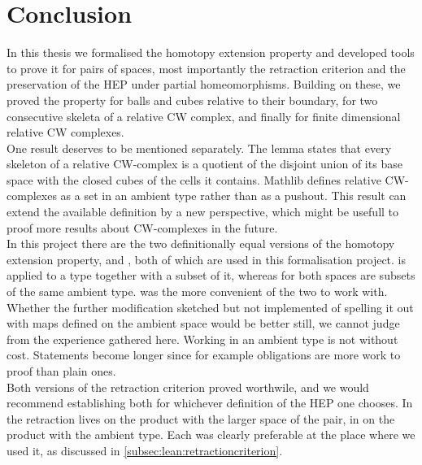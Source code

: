 \documentclass[11pt, a4paper, english]{article}
\theoremstyle{plain}
\theoremstyle{definition}
\theoremstyle{remark}
\numberwithin{equation}{section}
\numberwithin{theorem}{section}
\begin{document}
\clearpage
\section{Conclusion} \label{section:conclusion}
In this thesis we formalised the homotopy extension property and developed tools to prove it for pairs of spaces, most importantly the retraction criterion and the preservation of the HEP under partial homeomorphisms. Building on these, we proved the property for balls and cubes relative to their boundary, for two consecutive skeleta of a relative CW complex, and finally for finite dimensional relative CW complexes.\\

One result deserves to be mentioned separately. The lemma  states that every skeleton of a relative CW-complex is a quotient of the disjoint union of its base space with the closed cubes of the cells it contains. Mathlib defines relative CW-complexes as a set in an ambient type rather than as a pushout. This result can extend the available definition by a new perspective, which might be usefull to proof more results about CW-complexes in the future.\\ %

In this project there are the two definitionally equal versions of the homotopy extension property,  and , both of which are used in this formalisation project.  is applied to a type together with a subset of it, whereas for  both spaces are subsets of the same ambient type.  was the more convenient of the two to work with. Whether the further modification sketched but not implemented of spelling it out with maps defined on the ambient space would be better still, we cannot judge from the experience gathered here. Working in an ambient type is not without cost. Statements become longer since for example  obligations are more work to proof than plain  ones. \\ 
Both versions of the retraction criterion proved worthwile, and we would recommend establishing both for whichever definition of the HEP one chooses. In  the retraction lives on the product with the larger space of the pair, in  on the product with the ambient type. Each was clearly preferable at the place where we used it, as discussed in \cref{subsec:lean:retractioncriterion}. \\
\end{document}
